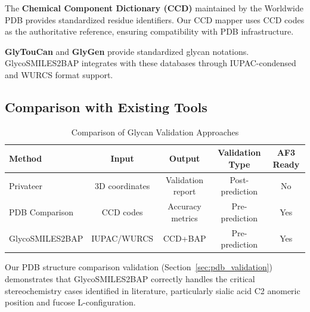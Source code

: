 The \textbf{Chemical Component Dictionary (CCD)} maintained by the Worldwide 
PDB provides standardized residue identifiers. Our CCD mapper uses CCD codes 
as the authoritative reference, ensuring compatibility with PDB infrastructure.

\textbf{GlyTouCan} \citep{tiemeyer2016} and \textbf{GlyGen} \citep{campbell2020} 
provide standardized glycan notations. GlycoSMILES2BAP integrates with these 
databases through IUPAC-condensed and WURCS format support.

\subsection{Comparison with Existing Tools}

\begin{table}[h]
\centering
\caption{Comparison of Glycan Validation Approaches}
\begin{tabular}{lcccc}
\toprule
Method & Input & Output & Validation Type & AF3 Ready \\
\midrule
Privateer & 3D coordinates & Validation report & Post-prediction & No \\
PDB Comparison & CCD codes & Accuracy metrics & Pre-prediction & Yes \\
GlycoSMILES2BAP & IUPAC/WURCS & CCD+BAP & Pre-prediction & Yes \\
\bottomrule
\end{tabular}
\end{table}

Our PDB structure comparison validation (Section~\ref{sec:pdb_validation}) 
demonstrates that GlycoSMILES2BAP correctly handles the critical stereochemistry 
cases identified in literature, particularly sialic acid C2 anomeric position 
and fucose L-configuration.
